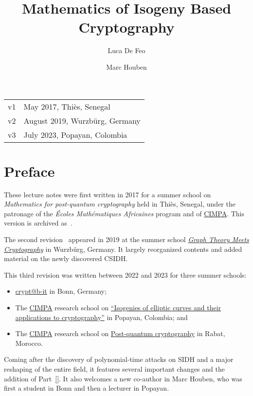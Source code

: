 \documentclass[10pt]{article}
\title{Mathematics of Isogeny Based Cryptography}
\author{Luca De Feo}
\affil{
  \textcolor{gray}{Université de Versailles, France}\\
  \textcolor{gray}{Inria Saclay, Palaiseau, France}\\
  IBM Research Europe, Z\"urich, Switzerland\\
  \url{https://defeo.lu/}
}
\author{Marc Houben}
\affil{
  Universiteit Leiden, Netherlands\\
  KU Leuven, Belgium
}
\date{}
\theoremstyle{plain}
\theoremstyle{definition}
\begin{document}
\maketitle

\begin{center}
  \begin{tabular}{r @{~--~} l}
    \color{gray}v1 & \color{gray}May 2017, Thi\`es, Senegal\\
    \color{gray}v2 & \color{gray}August 2019, Wurzb\"urg, Germany\\
    v3 & July 2023, Popayan, Colombia
  \end{tabular}
\end{center}

\thispagestyle{fancy}
\renewcommand{\headrulewidth}{0pt}
\renewcommand{\footrulewidth}{0.4pt}
\cfoot{\doclicenseThis}

\section*{Preface}

These lecture notes were first written in 2017 for a summer school on
\emph{Mathematics for post-quantum cryptography} held in Thiès,
Senegal, under the patronage of the \emph{\'Ecoles Math\'ematiques
  Africaines} program and of \href{https://www.cimpa.info/}{CIMPA}.
This version is archived as~\cite{defeo2017isogenybased}.

The second revision~\cite{defeo2017isogenybased} appeared in 2019 at
the summer school
\href{https://ifm.mathematik.uni-wuerzburg.de/summerschool2019/}{\emph{Graph
    Theory Meets Cryptography}} in Wurzb\"urg, Germany. %
It largely reorganized contents and added material on the newly
discovered CSIDH. %

This third revision was written between 2022 and 2023 for three summer
schools:
\begin{itemize}
\item \href{https://cryptabit.bit.uni-bonn.de/2022}{crypt@b-it} in
  Bonn, Germany;
\item The \href{https://www.cimpa.info/}{CIMPA} research school on
  \href{http://www.rnta.eu/Popayan2023/}{``Isogenies of elliptic
    curves and their applications to cryptography''} in Popayan,
  Colombia; and
\item The \href{https://www.cimpa.info/}{CIMPA} research school on
  \href{https://}{Post-quantum cryptography} in Rabat, Morocco.
\end{itemize}
Coming after the discovery of polynomial-time attacks on SIDH and a
major reshaping of the entire field, it features several important
changes and the addition of Part~\ref{}. %
It also welcomes a new co-author in Marc Houben, who was first a
student in Bonn and then a lecturer in Popayan.
\end{document}
